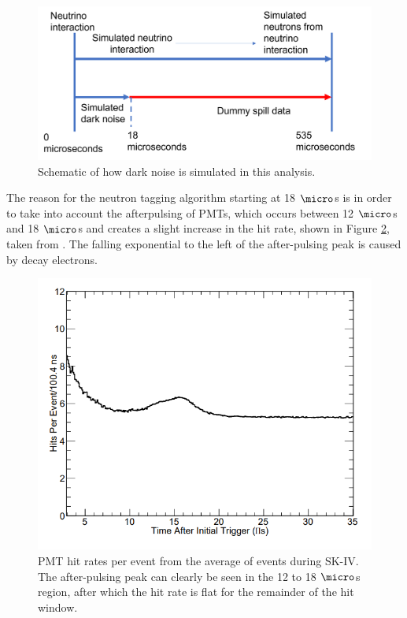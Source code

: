 \begin{figure}

    \includegraphics[width=\textwidth]{Figures/dark_rate_schematic.png}
    \caption{Schematic of how dark noise is simulated in this analysis.}
    \label{fig:dark_rate_schematic}

\end{figure}

The reason for the neutron tagging algorithm starting at 18 $\micro$s is in order to take into account the afterpulsing of PMTs, which occurs between 12 $\micro$s and 18 $\micro$s and creates a slight increase in the hit rate, shown in Figure \ref{fig:after_pulsing}, taken from \cite{}. The falling exponential to the left of the after-pulsing peak is caused by decay electrons. 

\begin{figure}

    \includegraphics[width=\textwidth]{Figures/after_pulsing.PNG}
    \caption{PMT hit rates per event from the average of events during SK-IV. The after-pulsing peak can clearly be seen in the 12 to 18 $\micro$s region, after which the hit rate is flat for the remainder of the hit window. }
    \label{fig:after_pulsing}

\end{figure}


